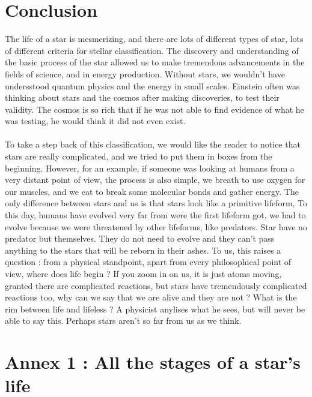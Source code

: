 \documentclass[a4paper, 11pt]{article} %
\begin{document}
\section*{Conclusion}

The life of a star is mesmerizing, and there are lots of different types of star, lots of different criteria for stellar classification. The discovery and understanding of the basic process of the star allowed us to make tremendous advancements in the fields of science, and in energy production. Without stars, we wouldn't have undersstood quantum physics and the energy in small scales. Einstein often was thinking about stars and the cosmos after making discoveries, to test their validity. The cosmos is so rich that if he was not able to find evidence of what he was testing, he would think it did not even exist. 
\paragraph*{}
To take a step back of this classification, we would like the reader to notice that stars are really complicated, and we tried to put them in boxes from the beginning. However, for an example, if someone was looking at humans from a very distant point of view, the process is also simple, we breath to use oxygen for our muscles, and we eat to break some molecular bonds and gather energy. The only difference between stars and us is that stars look like a primitive lifeform, To this day, humans have evolved very far from were the first lifeform got, we had to evolve because we were threatened by other lifeforms, like predators. Star have no predator but themselves. They do not need to evolve and they can't pass anything to the stars that will be reborn in their ashes. To us, this raises a question : from a physical standpoint, apart from every philosophical point of view, where does life begin ? If you zoom in on us, it is just atoms moving, granted there are complicated reactions, but stars have tremendously complicated reactions too, why can we say that we are alive and they are not ? What is the rim between life and lifeless ? A physicist anylises what he sees, but will never be able to say this. Perhaps stars aren't so far from us as we think.

\newpage



\section*{Annex 1 : All the stages of a star's life}
\end{document}
